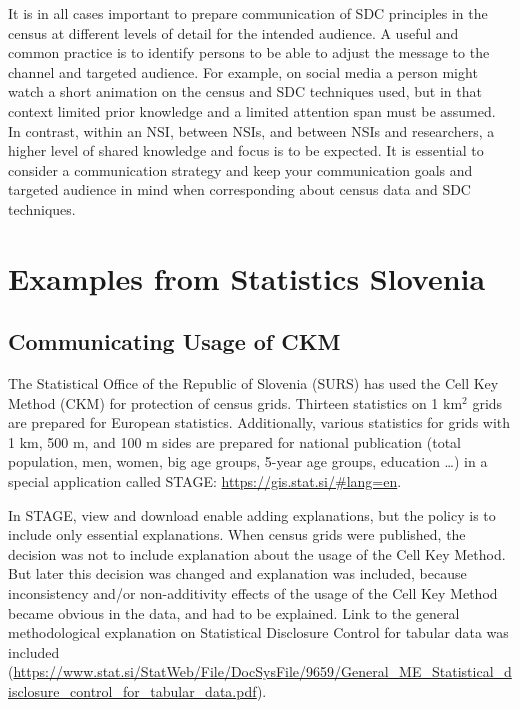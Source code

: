 It is in all cases important to prepare communication of SDC principles in the census at different levels of detail for the intended audience. A useful and common practice is to identify persons to be able to adjust the message to the channel and targeted audience. For example, on social media a person might watch a short animation on the census and SDC techniques used, but in that context limited prior knowledge and a limited attention span must be assumed. In contrast, within an NSI, between NSIs, and between NSIs and researchers, a higher level of shared knowledge and focus is to be expected. It is essential to consider a communication strategy and keep your communication goals and targeted audience in mind when corresponding about census data and SDC techniques. 





\section{Examples from Statistics Slovenia}



\subsection{Communicating Usage of CKM}

The Statistical Office of the Republic of Slovenia (SURS) has used the Cell Key Method (CKM) for protection of census grids. Thirteen statistics on 1 km$^{2}$ grids are prepared for European statistics. Additionally, various statistics for grids with 1 km, 500 m, and 100 m sides are prepared for national publication (total population, men, women, big age groups, 5-year age groups, education …) in a special application called STAGE: \url{https://gis.stat.si/#lang=en}.

In STAGE, view and download enable adding explanations, but the policy is to include only essential explanations. When census grids were published, the decision was not to include explanation about the usage of the Cell Key Method. But later this decision was changed and explanation was included, because inconsistency and/or non-additivity effects of the usage of the Cell Key Method became obvious in the data, and had to be explained. Link to the general methodological explanation on Statistical Disclosure Control for tabular data was included (\url{https://www.stat.si/StatWeb/File/DocSysFile/9659/General_ME_Statistical_disclosure_control_for_tabular_data.pdf}).

